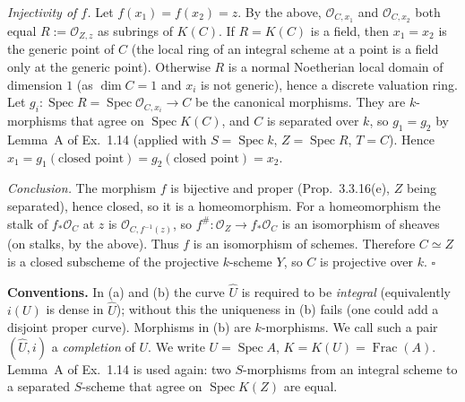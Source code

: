 \documentclass[11pt]{article}
\begin{document}
\emph{Injectivity of $f$.} Let $f(x_1)=f(x_2)=z$. By the above, $\mathcal O_{C,x_1}$ and $\mathcal O_{C,x_2}$ both equal $R:=\mathcal O_{Z,z}$ as subrings of $K(C)$. If $R=K(C)$ is a field, then $x_1=x_2$ is the generic point of $C$ (the local ring of an integral scheme at a point is a field only at the generic point). Otherwise $R$ is a normal Noetherian local domain of dimension $1$ (as $\dim C=1$ and $x_i$ is not generic), hence a discrete valuation ring. Let $g_i:\operatorname{Spec}R=\operatorname{Spec}\mathcal O_{C,x_i}\to C$ be the canonical morphisms. They are $k$-morphisms that agree on $\operatorname{Spec}K(C)$, and $C$ is separated over $k$, so $g_1=g_2$ by Lemma~A of Ex.~1.14 (applied with $S=\operatorname{Spec}k$, $Z=\operatorname{Spec}R$, $T=C$). Hence $x_1=g_1(\text{closed point})=g_2(\text{closed point})=x_2$.

\emph{Conclusion.} The morphism $f$ is bijective and proper (Prop.~3.3.16(e), $Z$ being separated), hence closed, so it is a homeomorphism. For a homeomorphism the stalk of $f_*\mathcal O_C$ at $z$ is $\mathcal O_{C,f^{-1}(z)}$, so $f^\#:\mathcal O_Z\to f_*\mathcal O_C$ is an isomorphism of sheaves (on stalks, by the above). Thus $f$ is an isomorphism of schemes. Therefore $C\simeq Z$ is a closed subscheme of the projective $k$-scheme $Y$, so $C$ is projective over $k$. \hfill$\square$

\pf
\textbf{Conventions.} In (a) and (b) the curve $\hat U$ is required to be \emph{integral} (equivalently $i(U)$ is dense in $\hat U$); without this the uniqueness in (b) fails (one could add a disjoint proper curve). Morphisms in (b) are $k$-morphisms. We call such a pair $(\hat U,i)$ a \emph{completion} of $U$. We write $U=\operatorname{Spec}A$, $K=K(U)=\operatorname{Frac}(A)$. Lemma~A of Ex.~1.14 is used again: two $S$-morphisms from an integral scheme to a separated $S$-scheme that agree on $\operatorname{Spec}K(Z)$ are equal.
\end{document}
